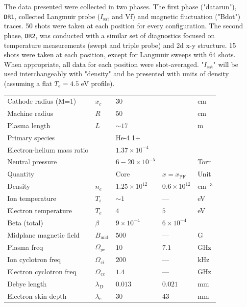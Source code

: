 The data presented were collected in two phases. The first phase ("datarun"), \texttt{DR1}, collected Langmuir probe ($I_\text{sat}$ and Vf) and magnetic fluctuation ("Bdot") \cite{Everson_design_2009} traces. 50 shots were taken at each position for every configuration. 
The second phase, \texttt{DR2}, was conducted with a similar set of diagnostics focused on temperature measurements (swept and triple probe) and 2d x-y structure. 15 shots were taken at each position, except for Langmuir sweeps with 64 shots. When appropriate, all data for each position were shot-averaged.
"$I_\text{sat}$" will be used interchangeably with "density" and be presented with units of density (assuming a flat $T_e = 4.5$ eV profile).

\begin{table}
    \centering
    \begin{tabular}{l l l l l}
        Cathode radius (M=1) & $x_c$ & $30$ && cm \\
        Machine radius & $R$ & $50$ && cm \\
        Plasma length & $L$ & $\sim 17$ && m \\
        Primary species && He-4 1+ \\ 
        Electron-helium mass ratio && $1.37 \times 10^{-4}$ \\
        Neutral pressure && $6 - 20 \times 10^{-5}$ && Torr \\
        \hline
        Quantity &  & Core & $x=x_\text{PF}$ & Unit \\
        \hline
        Density & $n_e$ &  $1.25 \times 10^{12}$ & $ 0.6 \times 10^{12}$ & $\text{cm}^{-3}$ \\
        Ion temperature & $T_i$ & $\sim 1$ & — & eV \\
        Electron temperature & $T_e$ & $4$ & $5$ & eV \\
        Beta (total) & $\beta$ & $9 \times 10^{-4}$ & $6 \times 10^{-4}$ & \\
        Midplane magnetic field & $B_\text{mid}$ & $500$ & — & G \\
        Plasma freq & $\Omega_{pe}$ & $10$ & $7.1 $& GHz \\
        Ion cyclotron freq & $\Omega_{ci}$ & $200$ & — & kHz \\
        Electron cyclotron freq & $\Omega_{ce}$ & $1.4$ & — & GHz \\
        Debye length & $\lambda_D$ & $0.013$ & $0.021$ & mm \\
        Electron skin depth & $\lambda_{e}$ & $30$ & $43$ & mm\\

\end{tabular}
\end{table}
